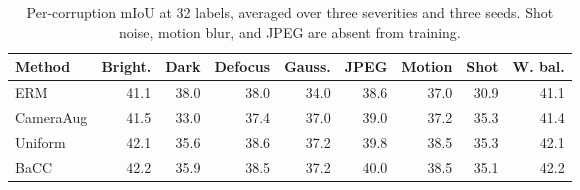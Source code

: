 \begin{table}[t]
\centering
\caption{Per-corruption mIoU at 32 labels, averaged over three severities and three seeds. Shot noise, motion blur, and JPEG are absent from training.}
\label{tab:corruptions}
\scriptsize
\setlength{\tabcolsep}{2.5pt}
\begin{tabular}{lrrrrrrrr}
\toprule
Method & Bright. & Dark & Defocus & Gauss. & JPEG & Motion & Shot & W. bal. \\
\midrule
ERM & 41.1 & 38.0 & 38.0 & 34.0 & 38.6 & 37.0 & 30.9 & 41.1 \\ 
CameraAug & 41.5 & 33.0 & 37.4 & 37.0 & 39.0 & 37.2 & 35.3 & 41.4 \\ 
Uniform & 42.1 & 35.6 & 38.6 & 37.2 & 39.8 & 38.5 & 35.3 & 42.1 \\ 
BaCC & 42.2 & 35.9 & 38.5 & 37.2 & 40.0 & 38.5 & 35.1 & 42.2 \\ 
\bottomrule
\end{tabular}
\end{table}
